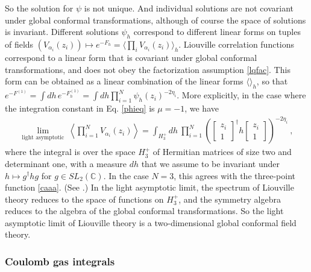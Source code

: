 \documentclass[12pt, a4paper, notitlepage, twoside]{report}
\numberwithin{equation}{section}
\theoremstyle{break}
\begin{document}
So the solution for $\psi$ is not unique. And individual solutions are not covariant under global conformal transformations, although of course the space of solutions is invariant.
Different solutions $\psi_h$ correspond to different linear forms on tuples of fields $(V_{\alpha_i}(z_i)) \mapsto e^{-F_h} = \langle \prod_i V_{\alpha_i}(z_i)\rangle_h$. 
Liouville correlation functions correspond to a linear form that is covariant under global conformal transformations, and does not obey the factorization assumption \eqref{lqfac}. 
This form can be obtained as a linear combination of the linear forms $\langle \rangle_h$, so that $e^{-F^{(1)}} = \int dh\, e^{-F^{(1)}_h} = \int dh \prod_{i=1}^N \psi_h(z_i)^{-2\eta_i}$. 
More explicitly, in the case where the integration constant in Eq. \eqref{phieq} is $\mu=-1$, we have
\begin{align}
\underset{\text{light asymptotic}}{\lim}\ \left\langle\prod_{i=1}^N V_{\alpha_i}(z_i)\right\rangle= \int_{H^+_3} dh\ \prod_{i=1}^N \left( \left[\begin{smallmatrix} z_i \\ 1 \end{smallmatrix}\right]^\dagger h \left[\begin{smallmatrix} z_i \\ 1 \end{smallmatrix}\right] \right)^{-2\eta_i}\ ,
\label{zih}
\end{align}
where the integral is over the space \textbf{\boldmath $H_3^+$} of Hermitian matrices of size two and determinant one, with a measure $dh$ that we assume to be invariant under $h\mapsto g^\dagger hg$ for $g\in SL_2({\mathbb{C}})$.
In the case $N=3$, this agrees with the three-point function \eqref{caaa}. (See \cite{zz95}.) In the light asymptotic limit, the spectrum of Liouville theory reduces to the space of functions on $H_3^+$, and the symmetry algebra reduces to the algebra of the global conformal transformations.
So
the light asymptotic limit of Liouville theory is a two-dimensional global conformal field theory.

\subsubsection{Coulomb gas integrals}
\end{document}
